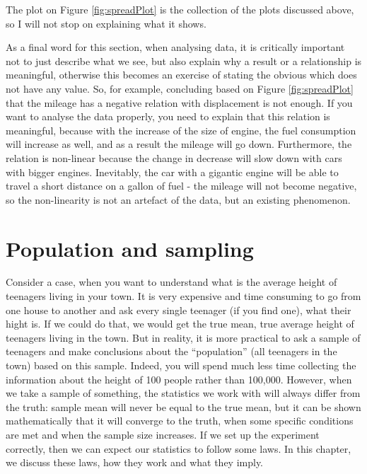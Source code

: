 \documentclass[
]{book}
\theoremstyle{definition}
\theoremstyle{definition}
\theoremstyle{definition}
\theoremstyle{definition}
\theoremstyle{remark}
\begin{document}
The plot on Figure \ref{fig:spreadPlot} is the collection of the plots discussed above, so I will not stop on explaining what it shows.

As a final word for this section, when analysing data, it is critically important not to just describe what we see, but also explain why a result or a relationship is meaningful, otherwise this becomes an exercise of stating the obvious which does not have any value. So, for example, concluding based on Figure \ref{fig:spreadPlot} that the mileage has a negative relation with displacement is not enough. If you want to analyse the data properly, you need to explain that this relation is meaningful, because with the increase of the size of engine, the fuel consumption will increase as well, and as a result the mileage will go down. Furthermore, the relation is non-linear because the change in decrease will slow down with cars with bigger engines. Inevitably, the car with a gigantic engine will be able to travel a short distance on a gallon of fuel - the mileage will not become negative, so the non-linearity is not an artefact of the data, but an existing phenomenon.

\hypertarget{PopulationSampling}{%
\chapter{Population and sampling}\label{PopulationSampling}}

Consider a case, when you want to understand what is the average height of teenagers living in your town. It is very expensive and time consuming to go from one house to another and ask every single teenager (if you find one), what their hight is. If we could do that, we would get the true mean, true average height of teenagers living in the town. But in reality, it is more practical to ask a sample of teenagers and make conclusions about the ``population'' (all teenagers in the town) based on this sample. Indeed, you will spend much less time collecting the information about the height of 100 people rather than 100,000. However, when we take a sample of something, the statistics we work with will always differ from the truth: sample mean will never be equal to the true mean, but it can be shown mathematically that it will converge to the truth, when some specific conditions are met and when the sample size increases. If we set up the experiment correctly, then we can expect our statistics to follow some laws. In this chapter, we discuss these laws, how they work and what they imply.
\end{document}
